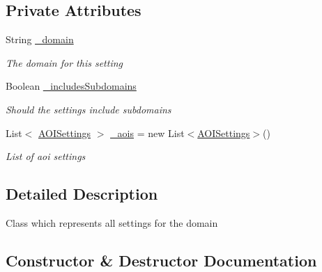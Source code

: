 \subsection*{Private Attributes}
\begin{DoxyCompactItemize}
\item 
String \hyperlink{class_web_analyzer_1_1_models_1_1_settings_model_1_1_domain_settings_afa680d53400203a363281f43b9ec7bff}{\+\_\+domain}
\begin{DoxyCompactList}\small\item\em The domain for this setting \end{DoxyCompactList}\item 
Boolean \hyperlink{class_web_analyzer_1_1_models_1_1_settings_model_1_1_domain_settings_ab1ad21ee7235f8b303bb0196bd3ede4f}{\+\_\+includes\+Subdomains}
\begin{DoxyCompactList}\small\item\em Should the settings include subdomains \end{DoxyCompactList}\item 
List$<$ \hyperlink{class_web_analyzer_1_1_models_1_1_settings_model_1_1_a_o_i_settings}{A\+O\+I\+Settings} $>$ \hyperlink{class_web_analyzer_1_1_models_1_1_settings_model_1_1_domain_settings_a67344a2db4f2e9ee7951eb7cad18f96e}{\+\_\+aois} = new List$<$\hyperlink{class_web_analyzer_1_1_models_1_1_settings_model_1_1_a_o_i_settings}{A\+O\+I\+Settings}$>$()
\begin{DoxyCompactList}\small\item\em List of aoi settings \end{DoxyCompactList}\end{DoxyCompactItemize}


\subsection{Detailed Description}
Class which represents all settings for the domain 



\subsection{Constructor \& Destructor Documentation}
\hypertarget{class_web_analyzer_1_1_models_1_1_settings_model_1_1_domain_settings_a8ffad3f7b78462d687db4f95dd484953}{}

